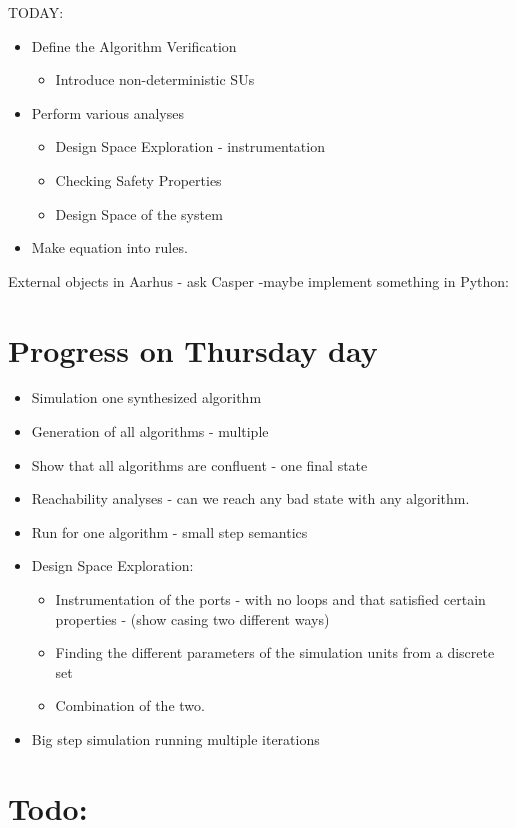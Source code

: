 \documentclass[runningheads]{llncs}
\begin{document}
TODAY:
\begin{itemize}
  \item Define the Algorithm Verification
  \begin{itemize}
    \item Introduce non-deterministic SUs
  \end{itemize}
  \item Perform various analyses
  \begin{itemize}
    \item Design Space Exploration - instrumentation
    \item Checking Safety Properties
    \item Design Space of the system
  \end{itemize}
  \item Make equation into rules.
\end{itemize}

External objects in Aarhus - ask Casper -maybe implement something in Python:



\section{Progress on Thursday day}
\begin{itemize}
  \item Simulation one synthesized algorithm
  \item Generation of all algorithms - multiple
  \item Show that all algorithms are confluent - one final state
  \item Reachability analyses - can we reach any bad state with any algorithm.
  \item Run for one algorithm - small step semantics
  \item Design Space Exploration:
  \begin{itemize}
    \item Instrumentation of the ports - with no loops and that satisfied certain properties - (show casing two different ways)
    \item Finding the different parameters of the simulation units from a discrete set
    \item Combination of the two.
  \end{itemize}
  \item  Big step simulation running multiple iterations
\end{itemize}

\section{Todo:}
\end{document}
